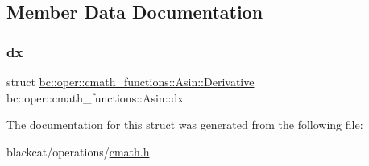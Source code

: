 \subsection{Member Data Documentation}
\mbox{\label{structbc_1_1oper_1_1cmath__functions_1_1Asin_abcdbbb996217835499d48d5c64ea5a06}} 
\subsubsection{\texorpdfstring{dx}{dx}}
{\footnotesize\ttfamily struct \hyperlink{structbc_1_1oper_1_1cmath__functions_1_1Asin_1_1Derivative}{bc\+::oper\+::cmath\+\_\+functions\+::\+Asin\+::\+Derivative}   bc\+::oper\+::cmath\+\_\+functions\+::\+Asin\+::dx}



The documentation for this struct was generated from the following file\+:\begin{DoxyCompactItemize}
\item 
blackcat/operations/\hyperlink{cmath_8h}{cmath.\+h}\end{DoxyCompactItemize}
